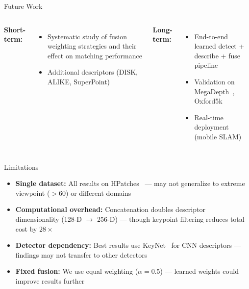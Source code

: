 \documentclass[aspectratio=169, 12pt]{beamer}
\begin{document}
\begin{frame}{Future Work}
  \begin{columns}[T]
    \textbf{Short-term:}
    \begin{itemize}
      \item Systematic study of fusion weighting strategies and their effect on matching performance
      \item Additional descriptors (DISK, ALIKE, SuperPoint)
    \end{itemize}
    \textbf{Long-term:}
    \begin{itemize}
      \item End-to-end learned detect + describe + fuse pipeline
      \item Validation on MegaDepth~\cite{li2018megadepth}, Oxford5k~\cite{oxford-dataset}
      \item Real-time deployment (mobile SLAM)
    \end{itemize}
  \end{columns}
\end{frame}

\begin{frame}{Limitations}
  \begin{itemize}
    \item \textbf{Single dataset:} All results on HPatches~\cite{balntas2017hpatches} ---
          may not generalize to extreme viewpoint ($>$60\textdegree) or different domains
    \item \textbf{Computational overhead:} Concatenation doubles descriptor dimensionality
          (128-D $\to$ 256-D) --- though keypoint filtering reduces total cost by $28\times$
    \item \textbf{Detector dependency:} Best results use KeyNet~\cite{barroso2019key}
          for CNN descriptors --- findings may not transfer to other detectors
    \item \textbf{Fixed fusion:} We use equal weighting ($\alpha = 0.5$) ---
          learned weights could improve results further
  \end{itemize}
\end{frame}
\end{document}
